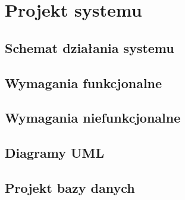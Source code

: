 \section{Projekt systemu}
\subsection{Schemat działania systemu}
\subsection{Wymagania funkcjonalne}
\subsection{Wymagania niefunkcjonalne}
\subsection{Diagramy UML}
\subsection{Projekt bazy danych}